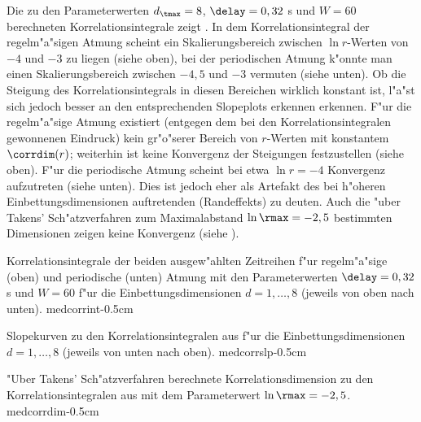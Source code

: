 Die zu den Parameterwerten $d_\tmax=8$, $\delay=0,32$ s und $W=60$ berechneten
Korrelationsintegrale zeigt . In dem Korrelationsintegral der
regelm"a"sigen Atmung scheint ein Skalierungsbereich zwischen $\ln r$-Werten von  $-4$ und 
$-3$ zu liegen (siehe  oben), bei der periodischen Atmung k"onnte man einen Skalierungsbereich zwischen
$-4,5$ und $-3$ vermuten (siehe  unten).
Ob die Steigung des Korrelationsintegrals in diesen Bereichen wirklich konstant ist,
l"a"st sich jedoch besser an den entsprechenden Slopeplots erkennen erkennen. F"ur die
regelm"a"sige Atmung existiert (entgegen dem bei den Korrelationsintegralen gewonnenen Eindruck)
kein gr"o"serer Bereich von $r$-Werten
mit konstantem $\corrdim(r)$; weiterhin ist keine Konvergenz der Steigungen festzustellen
(siehe  oben). F"ur die
periodische Atmung scheint bei etwa $\ln r=-4$ Konvergenz aufzutreten (siehe
 unten). Dies ist jedoch eher
als Artefakt des bei h"oheren Einbettungsdimensionen auftretenden \begriff(Randeffekts)
zu deuten. Auch die "uber Takens' Sch"atzverfahren zum Maximalabstand $\ln\rmax=-2,5$ bestimmten
Dimensionen zeigen keine Konvergenz (siehe ). 


{
Korrelationsintegrale der beiden ausgew"ahlten Zeitreihen f"ur regelm"a"sige (oben) und
periodische (unten) Atmung mit den Parameterwerten $\delay=0,32$ s und $W=60$ f"ur die
Einbettungsdimensionen $d=1,\dots,8$ (jeweils von oben nach unten).
}
{medcorrint}{-0.5cm}

{
Slopekurven zu den Korrelationsintegralen aus  f"ur die 
Einbettungsdimensionen $d=1,\dots,8$ (jeweils von unten nach oben).
}
{medcorrslp}{-0.5cm}

{
"Uber Takens' Sch"atzverfahren berechnete Korrelationsdimension  zu den
Korrelationsintegralen aus  mit dem Parameterwert $\ln\rmax=-2,5 $.
}
{medcorrdim}{-0.5cm}



